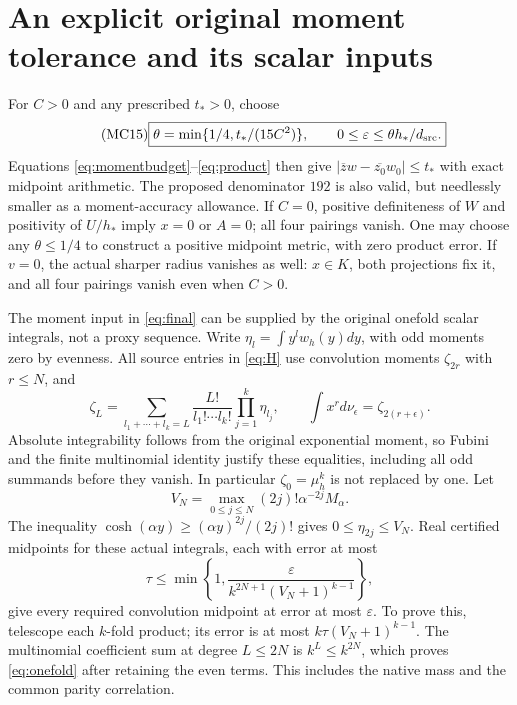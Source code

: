 \documentclass[11pt]{article}
\begin{document}
\section{An explicit original moment tolerance and its scalar inputs}

For $C>0$ and any prescribed $t_*>0$, choose
\begin{equation}\tag{MC15}\label{eq:final}
 \boxed{\theta=\min\{1/4,t_*/(15C^2)\},\qquad
 0\le\varepsilon\le\theta h_*/d_{\rm src}.}
\end{equation}
Equations \eqref{eq:momentbudget}--\eqref{eq:product} then give
$|\overline z w-\overline{z_0}w_0|\le t_*$ with exact midpoint
arithmetic. The proposed denominator $192$ is also valid, but
needlessly smaller as a moment-accuracy allowance. If $C=0$,
positive definiteness of $W$ and positivity of $U/h_*$ imply
$x=0$ or $A=0$; all four pairings vanish. One may choose any
$\theta\le1/4$ to construct a positive midpoint metric, with
zero product error. If $v=0$, the actual sharper radius vanishes
as well: $x\in K$, both projections fix it, and all four pairings
vanish even when $C>0$.

The moment input in \eqref{eq:final} can be supplied by the
original onefold scalar integrals, not a proxy sequence. Write
$\eta_l=\int y^lw_h(y)dy$, with odd moments zero by evenness.
All source entries in \eqref{eq:H} use convolution moments
$\zeta_{2r}$ with $r\le N$, and
\[
 \zeta_L=\sum_{l_1+\cdots+l_k=L}
             \frac{L!}{l_1!\cdots l_k!}\prod_{j=1}^k\eta_{l_j},
 \qquad \int x^r d\nu_\epsilon=\zeta_{2(r+\epsilon)}.
\]
Absolute integrability follows from the original exponential
moment, so Fubini and the finite multinomial identity justify
these equalities, including all odd summands before they vanish.
In particular $\zeta_0=\mu_h^k$ is not replaced by one.
Let
\[
 V_N=\max_{0\le j\le N}(2j)!\alpha^{-2j}M_\alpha.
\]
The inequality $\cosh(\alpha y)\ge(\alpha y)^{2j}/(2j)!$
gives $0\le\eta_{2j}\le V_N$. Real certified midpoints for
these actual integrals, each with error at most
\begin{equation}\tag{MC16}\label{eq:onefold}
 \tau\le\min\left\{1,
         \frac{\varepsilon}{k^{2N+1}(V_N+1)^{k-1}}\right\},
\end{equation}
give every required convolution midpoint at error at most
$\varepsilon$. To prove this, telescope each $k$-fold product;
its error is at most $k\tau(V_N+1)^{k-1}$. The multinomial
coefficient sum at degree $L\le2N$ is $k^L\le k^{2N}$,
which proves \eqref{eq:onefold} after retaining the even terms.
This includes the native mass and the common parity correlation.
\end{document}
